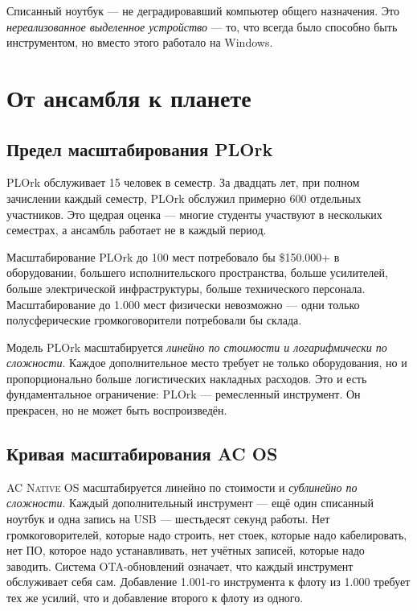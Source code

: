 \documentclass[10pt,letterpaper,twocolumn]{article}
\newcommand{\acos}{\textsc{AC Native OS}}
\begin{document}
Списанный ноутбук --- не деградировавший компьютер общего назначения. Это \emph{нереализованное выделенное устройство} --- то, что всегда было способно быть инструментом, но вместо этого работало на Windows.


\section{От ансамбля к планете}
\label{sec:scaling}

\subsection{Предел масштабирования PLOrk}

PLOrk обслуживает 15 человек в семестр. За двадцать лет, при полном зачислении каждый семестр, PLOrk обслужил примерно 600 отдельных участников. Это щедрая оценка --- многие студенты участвуют в нескольких семестрах, а ансамбль работает не в каждый период.

Масштабирование PLOrk до 100 мест потребовало бы \$150.000+ в оборудовании, большего исполнительского пространства, больше усилителей, больше электрической инфраструктуры, больше технического персонала. Масштабирование до 1.000 мест физически невозможно --- одни только полусферические громкоговорители потребовали бы склада.

Модель PLOrk масштабируется \emph{линейно по стоимости и логарифмически по сложности}. Каждое дополнительное место требует не только оборудования, но и пропорционально больше логистических накладных расходов. Это и есть фундаментальное ограничение: PLOrk --- ремесленный инструмент. Он прекрасен, но не может быть воспроизведён.

\subsection{Кривая масштабирования AC OS}

\acos{} масштабируется линейно по стоимости и \emph{сублинейно по сложности}. Каждый дополнительный инструмент --- ещё один списанный ноутбук и одна запись на USB --- шестьдесят секунд работы. Нет громкоговорителей, которые надо строить, нет стоек, которые надо кабелировать, нет ПО, которое надо устанавливать, нет учётных записей, которые надо заводить. Система OTA-обновлений означает, что каждый инструмент обслуживает себя сам. Добавление 1.001-го инструмента к флоту из 1.000 требует тех же усилий, что и добавление второго к флоту из одного.
\end{document}
